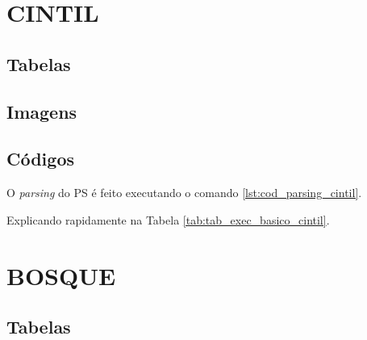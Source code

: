 \begin{apendicesenv}
\partapendices

\chapter{CINTIL}
\label{ap_cintil}

\section{Tabelas}
\label{ap_cintil_tab}

\begin{center}
    
\end{center}

\section{Imagens}
\label{ap_cintil_imagens}

\section{Códigos}
\label{ap_cintil_codigos}

O \textit{parsing} do PS é feito executando o comando \ref{lst:cod_parsing_cintil}.
\begin{center}
    
\end{center}

Explicando rapidamente na Tabela \ref{tab:tab_exec_basico_cintil}.

\begin{center}
    
\end{center}
\chapter{BOSQUE}
\label{ap_bosque}

\section{Tabelas}
\label{ap_bosque_tab}

\begin{center}
    
\end{center}

\begin{center}
    
\end{center}


\end{apendicesenv}
